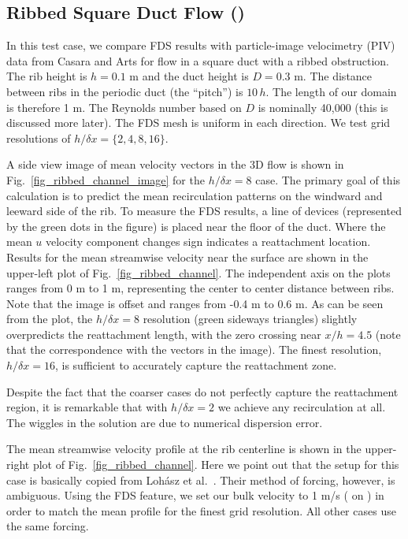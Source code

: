 \documentclass[11pt]{book}
\begin{document}
\clearpage

\subsection{Ribbed Square Duct Flow (\texorpdfstring{}{ribbed\_channel})}
\label{sec:ribbed_channel}

In this test case, we compare FDS results with particle-image velocimetry (PIV) data from Casara and Arts \cite{Casara:1} for flow in a square duct with a ribbed obstruction.  The rib height is $h = 0.1$ m and the duct height is $D = 0.3$ m.  The distance between ribs in the periodic duct (the ``pitch'') is $10 \, h$.  The length of our domain is therefore 1 m.  The Reynolds number based on $D$ is nominally 40,000 (this is discussed more later). The FDS mesh is uniform in each direction.  We test grid resolutions of $h/\delta x = \{2,4,8,16\}$.

A side view image of mean velocity vectors in the 3D flow is shown in Fig.~\ref{fig_ribbed_channel_image} for the $h/\delta x = 8$ case.  The primary goal of this calculation is to predict the mean recirculation patterns on the windward and leeward side of the rib.  To measure the FDS results, a line of devices (represented by the green dots in the figure) is placed near the floor of the duct.  Where the mean $u$ velocity component changes sign indicates a reattachment location.  Results for the mean streamwise velocity near the surface are shown in the upper-left plot of Fig.~\ref{fig_ribbed_channel}.  The independent axis on the plots ranges from 0 m to 1 m, representing the center to center distance between ribs.  Note that the image is offset and ranges from -0.4 m to 0.6 m.  As can be seen from the plot, the $h/\delta x = 8$ resolution (green sideways triangles) slightly overpredicts the reattachment length, with the zero crossing near $x/h = 4.5$ (note that the correspondence with the vectors in the image).  The finest resolution, $h/\delta x=16$, is sufficient to accurately capture the reattachment zone.

Despite the fact that the coarser cases do not perfectly capture the reattachment region, it is remarkable that with $h/\delta x = 2$ we achieve any recirculation at all.  The wiggles in the solution are due to numerical dispersion error.

The mean streamwise velocity profile at the rib centerline is shown in the upper-right plot of Fig.~\ref{fig_ribbed_channel}.  Here we point out that the setup for this case is basically copied from Loh\'asz et al.~\cite{Lohasz:1}.  Their method of forcing, however, is ambiguous.  Using the FDS  feature, we set our bulk velocity to 1 m/s ( on ) in order to match the mean profile for the finest grid resolution.  All other cases use the same forcing.
\end{document}
